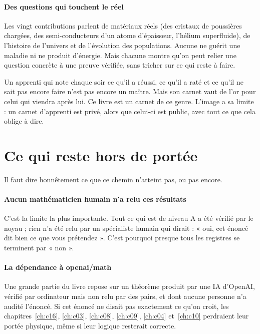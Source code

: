 \paragraph{Des questions qui touchent le réel} Les vingt contributions parlent de matériaux réels (des cristaux de
poussières chargées, des semi-conducteurs d'un atome d'épaisseur, l'hélium superfluide), de l'histoire de l'univers et
de l'évolution des populations. Aucune ne guérit une maladie ni ne produit d'énergie. Mais chacune montre qu'on peut
relier une question concrète à une preuve vérifiée, sans tricher sur ce qui reste à faire.

\begin{analogie}
Un apprenti qui note chaque soir ce qu'il a réussi, ce qu'il a raté et ce qu'il ne sait pas encore faire n'est pas
encore un maître. Mais son carnet vaut de l'or pour celui qui viendra après lui. Ce livre est un carnet de ce genre.
L'image a sa limite : un carnet d'apprenti est privé, alors que celui-ci est public, avec tout ce que cela oblige à
dire.
\end{analogie}

\section{Ce qui reste hors de portée}

Il faut dire honnêtement ce que ce chemin n'atteint pas, ou pas encore.

\paragraph{Aucun mathématicien humain n'a relu ces résultats} C'est la limite la plus importante. Tout ce qui est de
niveau A a été vérifié par le noyau ; rien n'a été relu par un spécialiste humain qui dirait : « oui, cet énoncé dit
bien ce que vous prétendez ». C'est pourquoi presque tous les registres se terminent par « non ».

\paragraph{La dépendance à openai/math} Une grande partie du livre repose sur un théorème produit par une IA d'OpenAI,
vérifié par ordinateur mais non relu par des pairs, et dont aucune personne n'a audité l'énoncé. Si cet énoncé ne
disait pas exactement ce qu'on croit, les chapitres~\ref{ch:c16}, \ref{ch:c03}, \ref{ch:c08}, \ref{ch:c09}, \ref{ch:c04}
et~\ref{ch:c10} perdraient leur portée physique, même si leur logique resterait correcte.


